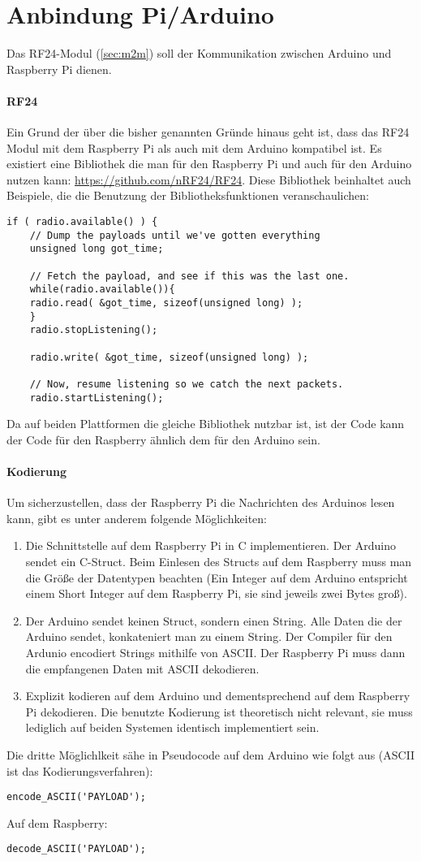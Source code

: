 \section{Anbindung Pi/Arduino}
\label{sec:anbindung_raspi_arduino}
Das RF24-Modul (\ref{sec:m2m}) soll der Kommunikation zwischen Arduino und Raspberry Pi dienen. 
\paragraph{RF24}
Ein Grund der über die bisher genannten Gründe hinaus geht ist, dass das RF24 Modul mit dem Raspberry Pi als auch mit dem Arduino kompatibel ist. Es existiert eine Bibliothek die man für den Raspberry Pi und auch für den Arduino nutzen kann: \url{https://github.com/nRF24/RF24}. Diese Bibliothek beinhaltet auch Beispiele, die die Benutzung der Bibliotheksfunktionen veranschaulichen: 
\lstset{language=c}
\begin{lstlisting}
if ( radio.available() ) {
	// Dump the payloads until we've gotten everything
	unsigned long got_time;
	
	// Fetch the payload, and see if this was the last one.
	while(radio.available()){
	radio.read( &got_time, sizeof(unsigned long) );
	}
	radio.stopListening();
				
	radio.write( &got_time, sizeof(unsigned long) );

	// Now, resume listening so we catch the next packets.
	radio.startListening();
\end{lstlisting}

Da auf beiden Plattformen die gleiche Bibliothek nutzbar ist, ist der Code kann der Code für den Raspberry ähnlich dem für den Arduino sein.
\paragraph{Kodierung}
Um sicherzustellen, dass der Raspberry Pi die Nachrichten des Arduinos lesen kann, gibt es unter anderem folgende Möglichkeiten:
\begin{enumerate}
\item Die Schnittstelle auf dem Raspberry Pi in C implementieren. Der Arduino sendet ein C-Struct. Beim Einlesen des Structs auf dem Raspberry muss man die Größe der Datentypen beachten (Ein Integer auf dem Arduino entspricht einem Short Integer auf dem Raspberry Pi, sie sind jeweils zwei Bytes groß).
\item Der Arduino sendet keinen Struct, sondern einen String. Alle Daten die der Arduino sendet, konkateniert man zu einem String. Der Compiler für den Ardunio encodiert Strings mithilfe von ASCII. Der Raspberry Pi muss dann die empfangenen Daten mit ASCII dekodieren.
\item Explizit kodieren auf dem Arduino und dementsprechend auf dem Raspberry Pi dekodieren. Die benutzte Kodierung ist theoretisch nicht relevant, sie muss lediglich auf beiden Systemen identisch implementiert sein.
\end{enumerate}

Die dritte Möglichlkeit sähe in Pseudocode auf dem Arduino wie folgt aus (ASCII ist das Kodierungsverfahren):
\lstset{language=c}
\begin{lstlisting}
encode_ASCII('PAYLOAD');
\end{lstlisting}
Auf dem Raspberry:
\lstset{language=c}
\begin{lstlisting}
decode_ASCII('PAYLOAD');
\end{lstlisting}
